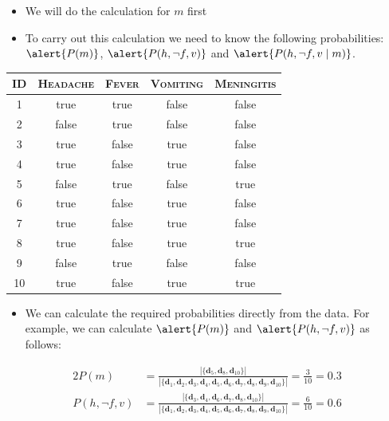 \documentclass[xcolor={table}]{beamer}
\newcommand{\featN}[1]{\textsc{#1}}
\begin{document}
 \begin{frame} 
  \begin{itemize}
	\item We will do the calculation for $m$ first
	\item To carry out this calculation we need to know the following probabilities: $\alert{P(m)}$, $\alert{P(h, \lnot f, v)}$ and $\alert{P(h, \lnot f, v\mid m)}$.
\end{itemize}
\begin{table}[!tb]
\centering
\begin{footnotesize}
\begin{tabular}{ccccc}
\hline
\featN{ID} & \featN{Headache} & \featN{Fever} & \featN{Vomiting} & \featN{Meningitis}\\
\hline
1 & true & true & false & false\\
2 & false & true & false & false\\
3 & true & false & true & false\\
4 & true & false & true & false\\
5 & false & true & false & true\\
6 & true & false & true & false\\
7 & true & false & true & false\\
8 & true & false & true & true\\
9 & false & true & false & false\\
10 & true & false & true & true\\
\hline
\end{tabular}
\end{footnotesize}
\end{table}
\end{frame}

\begin{frame}
\begin{itemize}
	\item We can calculate the required probabilities directly from the data. For example, we can calculate $\alert{P(m)}$ and $\alert{P(h, \lnot f, v)}$ as follows:
\end{itemize}
\begin{alignat*}{2}
P(m)&=\frac{\left| \{\mathbf{d}_5, \mathbf{d}_8, \mathbf{d}_{10} \} \right|}{\left| \{\mathbf{d}_1, \mathbf{d}_2, \mathbf{d}_3, \mathbf{d}_4, \mathbf{d}_5, \mathbf{d}_6, \mathbf{d}_7, \mathbf{d}_8, \mathbf{d}_9, \mathbf{d}_{10} \} \right|}=\frac{3}{10}=0.3\\
P(h, \lnot f, v)&=\frac{\left| \{ \mathbf{d}_3, \mathbf{d}_4, \mathbf{d}_6, \mathbf{d}_7, \mathbf{d}_8, \mathbf{d}_{10} \} \right|}{\left| \{ \mathbf{d}_1, \mathbf{d}_2, \mathbf{d}_3, \mathbf{d}_4, \mathbf{d}_5, \mathbf{d}_6, \mathbf{d}_7, \mathbf{d}_8, \mathbf{d}_9, \mathbf{d}_{10}\} \right|}=\frac{6}{10}=0.6\\
\end{alignat*}
\end{frame} 
\end{document}
